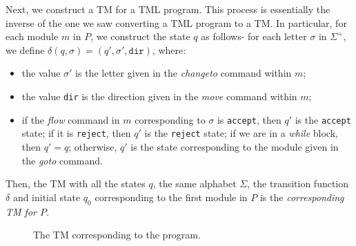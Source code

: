 \begin{appendices}
Next, we construct a TM for a TML program. This process is essentially the inverse of the one we saw converting a TML program to a TM. In particular, for each module $m$ in $P$, we construct the state $q$ as follows- for each letter $\sigma$ in $\Sigma^+$, we define $\delta(q, \sigma) = (q', \sigma', \texttt{dir})$, where:
\begin{itemize}
    \item the value $\sigma'$ is the letter given in the \textit{changeto} command within $m$;
    \item the value \texttt{dir} is the direction given in the \textit{move} command within $m$;
    \item if the \textit{flow} command in $m$ corresponding to $\sigma$ is \texttt{accept}, then $q'$ is the \texttt{accept} state; if it is \texttt{reject}, then $q'$ is the \texttt{reject} state; if we are in a \textit{while} block, then $q' = q$; otherwise, $q'$ is the state corresponding to the module given in the \textit{goto} command.
\end{itemize}
Then, the TM with all the states $q$, the same alphabet $\Sigma$, the transition function $\delta$ and initial state $q_0$ corresponding to the first module in $P$ is the \emph{corresponding TM for $P$}. 

\begin{figure}[htb]
    \centering
    \caption{The TM corresponding to the program.}
    \label{fig:tm_from_tml}
\end{figure}


\end{appendices}
